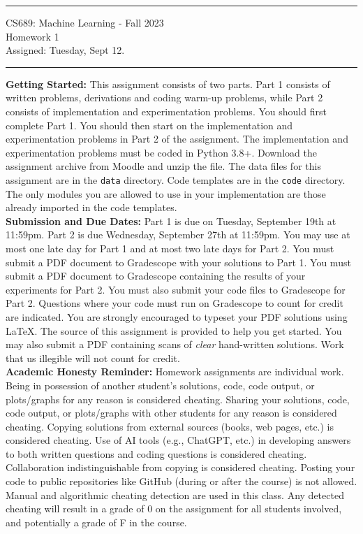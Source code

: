 \documentclass[11pt]{article}
\begin{document}
{\centering
  \rule{6.3in}{2pt}
  \vspace{1em}
  {\Large
    CS689: Machine Learning - Fall 2023\\
    Homework 1\\
  }
  \vspace{1em}
  Assigned: Tuesday, Sept 12.\\
  \vspace{0.1em}
  \rule{6.3in}{1.5pt}
}
\vspace{1pc}

\textbf{Getting Started:} This assignment consists of two parts. Part 1 consists of written problems, derivations and coding warm-up problems, while Part 2 consists of implementation and experimentation problems. You should first complete Part 1. You should then start on the implementation and experimentation problems in Part 2 of the assignment. The implementation and experimentation problems must be coded in Python 3.8+. Download the assignment archive from Moodle and unzip the file. The data files for this assignment are in the \verb|data| directory. Code templates are in the \verb|code| directory. The only modules you are allowed to use in your implementation are those already imported in the code templates.\\

\textbf{Submission and Due Dates:} Part 1 is due on Tuesday, September 19th at 11:59pm. Part 2 is due Wednesday, September 27th at 11:59pm. You may use at most one late day for Part 1 and at most two late days for Part 2. You must submit a PDF document to Gradescope with your solutions to Part 1. You must submit a PDF document to Gradescope containing the results of your experiments for Part 2. You must also submit your code files to Gradescope for Part 2. Questions where your code must run on Gradescope to count for credit are indicated. You are strongly encouraged to typeset your PDF solutions using LaTeX. The source of this assignment is provided to help you get started. You may also submit a PDF containing scans of \textit{clear} hand-written solutions. Work that us illegible will not count for credit.\\

\textbf{Academic Honesty Reminder:} Homework assignments are individual work. Being in possession of another student's solutions, code, code output, or plots/graphs for any reason is considered cheating. Sharing your solutions, code, code output, or plots/graphs with other students for any reason is considered cheating. Copying solutions from external sources (books, web pages, etc.) is considered cheating. Use of AI tools (e.g., ChatGPT, etc.) in developing answers to both written questions and coding questions is considered cheating. Collaboration indistinguishable from copying is considered cheating. Posting your code to public repositories like GitHub (during or after the course) is not allowed. Manual and algorithmic cheating detection are used in this class. Any detected cheating will result in a grade of 0 on the assignment for all students involved, and potentially a grade of F in the course. 
\\
\end{document}
